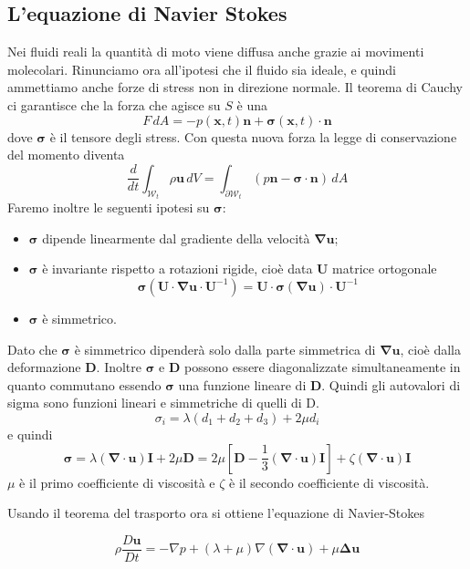 \documentclass{book}
\newcommand{\Nabla}{\boldsymbol{\nabla}}
\begin{document}
\subsection{L'equazione di Navier Stokes}
Nei fluidi reali la quantità di moto viene diffusa anche grazie ai movimenti molecolari.
Rinunciamo ora all'ipotesi che il fluido sia ideale, e quindi ammettiamo anche forze di stress non in direzione normale.
Il teorema di Cauchy ci garantisce che la forza che agisce su $S$ è una 
$$F \, dA = -p(\mathbf{x},t) \mathbf{n} + \boldsymbol{\sigma}(\mathbf{x},t) \cdot \mathbf{n}$$
dove $\boldsymbol{\sigma}$ è il tensore degli stress.
Con questa nuova forza la legge di conservazione del momento diventa
$$\frac{d}{dt} \int_{\mathcal{W}_t} \rho \mathbf{u} \, dV = \int_{\partial \mathcal{W}_t} (p \mathbf{n} - \boldsymbol{\sigma} \cdot \mathbf{n} )\, dA$$
Faremo inoltre le seguenti ipotesi su $\boldsymbol{\sigma}$: \begin{itemize}
  \item $\boldsymbol{\sigma}$ dipende linearmente dal gradiente della velocità $\Nabla \mathbf{u}$;
  \item $\boldsymbol{\sigma}$ è invariante rispetto a rotazioni rigide, cioè data $\mathbf{U}$ matrice ortogonale
$$\boldsymbol{\sigma}(\mathbf{U} \cdot \Nabla \mathbf{u} \cdot \mathbf{U}^{-1}) = \mathbf{U} \cdot \boldsymbol{\sigma}( \Nabla \mathbf{u} ) \cdot \mathbf{U}^{-1}$$
\item $\boldsymbol{\sigma}$ è simmetrico.
\end{itemize} 

Dato che $\boldsymbol{\sigma}$ è simmetrico dipenderà solo dalla parte simmetrica di $\Nabla \mathbf{u}$, cioè dalla deformazione $\mathbf{D}$. Inoltre $\boldsymbol{\sigma}$ e $\mathbf{D}$ possono essere diagonalizzate simultaneamente in quanto commutano essendo $\boldsymbol{\sigma}$ una funzione lineare di $\mathbf{D}$.
Quindi gli autovalori di sigma sono funzioni lineari e simmetriche di quelli di D.
$$\sigma_i = \lambda (d_1 + d_2 + d_3) +2 \mu d_i$$
e quindi 
$$\boldsymbol{\sigma} = \lambda ( \Nabla\cdot \mathbf{u}) \mathbf{I} + 2 \mu \mathbf{D}
                                     = 2 \mu [ \mathbf{D} - \frac{1}{3} ( \Nabla\cdot \mathbf{u}) \mathbf{I} ] + \zeta ( \Nabla\cdot \mathbf{u})  \mathbf{I}
$$
$\mu$ è il primo coefficiente di viscosità e $\zeta$ è il secondo coefficiente di viscosità.

Usando il teorema del trasporto ora si ottiene l'equazione di Navier-Stokes

$$\rho \frac{D\mathbf{u}}{Dt} = -\nabla p + (\lambda+\mu) \nabla(\Nabla \cdot \mathbf{u}) + \mu \boldsymbol{\Delta} \mathbf{u}$$
\end{document}
